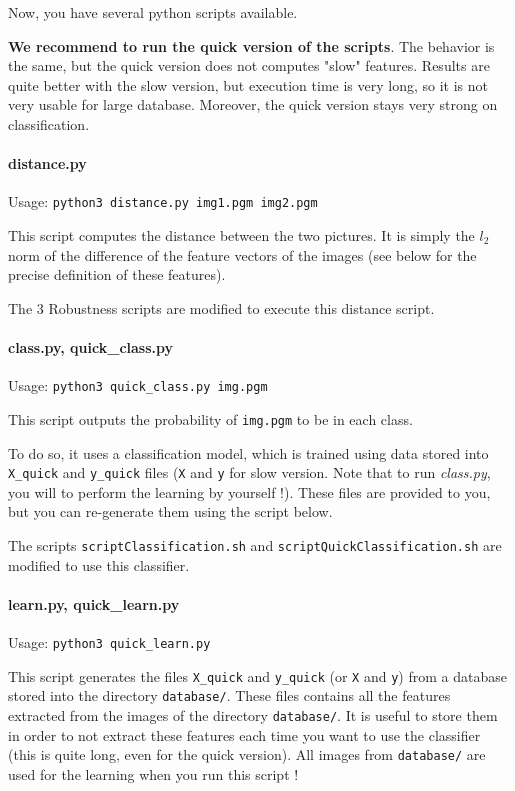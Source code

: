 \documentclass[12pt]{article}
\begin{document}
\bigskip

Now, you have several python scripts available.

\textbf{We recommend to run the quick version of the scripts}. The behavior is the same, but the quick version does not computes "slow" features. Results are quite better with the slow version, but execution time is very long, so it is not very usable for large database. Moreover, the quick version stays very strong on classification.

\paragraph{distance.py} Usage: \texttt{python3 distance.py img1.pgm img2.pgm}

This script computes the distance between the two pictures. It is simply the $l_2$ norm of the difference of the feature vectors of the images (see below for the precise definition of these features).

The 3 Robustness scripts are modified to execute this distance script.

\paragraph{class.py, quick\_class.py}
Usage: \texttt{python3 quick\_class.py img.pgm}

This script outputs the probability of \texttt{img.pgm} to be in each class. 

To do so, it uses a classification model, which is trained using data stored into \texttt{X\_quick} and \texttt{y\_quick} files (\texttt{X} and \texttt{y} for slow version. 
Note that to run \textit{class.py}, you will to perform the learning by yourself !). These files are provided to you, but you can re-generate them using the script below.

The scripts \texttt{scriptClassification.sh} and \texttt{scriptQuickClassification.sh} are modified to use this classifier.

\paragraph{learn.py, quick\_learn.py}
Usage: \texttt{python3 quick\_learn.py}

This script generates the files \texttt{X\_quick} and \texttt{y\_quick} (or \texttt{X} and \texttt{y}) from a database stored into the directory \texttt{database/}.
These files contains all the features extracted from the images of the directory \texttt{database/}. It is useful to store them in order to not extract these features each time you want to use the classifier (this is quite long, even for the quick version).
All images from \texttt{database/} are used for the learning when you run this script !
\end{document}
